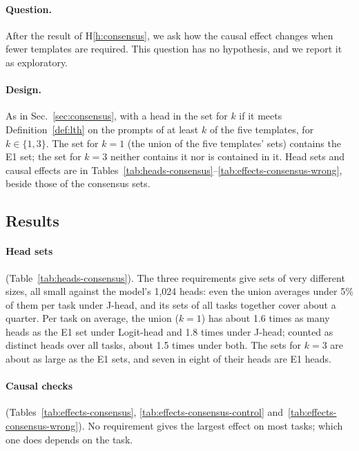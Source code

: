 \documentclass[11pt,a4paper]{article}
\begin{document}
\paragraph{Question.} After the result of H\ref{h:consensus}, we ask how the causal effect changes when fewer templates are required. This question has no hypothesis, and we report it as exploratory.

\paragraph{Design.} As in Sec.~\ref{sec:consensus}, with a head in the set for $k$ if it meets Definition~\ref{def:lth} on the prompts of at least $k$ of the five templates, for $k\in\{1,3\}$. The set for $k=1$ (the union of the five templates' sets) contains the E1 set; the set for $k=3$ neither contains it nor is contained in it. Head sets and causal effects are in Tables~\ref{tab:heads-consensus}--\ref{tab:effects-consensus-wrong}, beside those of the consensus sets.

\subsection{Results}\label{sec:res-k13}
\paragraph{Head sets} (Table~\ref{tab:heads-consensus}). The three requirements give sets of very different sizes, all small against the model's 1,024 heads: even the union averages under 5\% of them per task under J-head, and its sets of all tasks together cover about a quarter. Per task on average, the union ($k=1$) has about 1.6 times as many heads as the E1 set under Logit-head and 1.8 times under J-head; counted as distinct heads over all tasks, about 1.5 times under both. The sets for $k=3$ are about as large as the E1 sets, and seven in eight of their heads are E1 heads.

\paragraph{Causal checks} (Tables~\ref{tab:effects-consensus}, \ref{tab:effects-consensus-control} and~\ref{tab:effects-consensus-wrong}). No requirement gives the largest effect on most tasks; which one does depends on the task.
\end{document}
